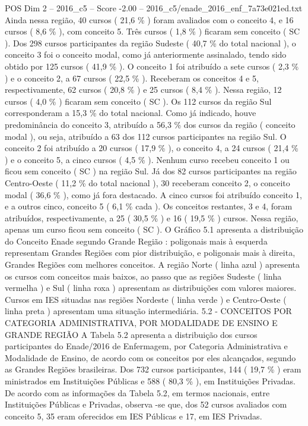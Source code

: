 \begin{textsample}{POS Dim 2 – 2016\_c5 – Score -2.00 – 2016\_c5/enade\_2016\_enf\_7a73e021ed.txt}
Ainda nessa região, 40 cursos ( 21,6 \% ) foram avaliados com o conceito 4, e 16 cursos ( 8,6 \% ), com conceito 5.
Três cursos ( 1,8 \% ) ficaram sem conceito ( SC ).
Dos 298 cursos participantes da região Sudeste ( 40,7 \% do total nacional ), o conceito 3 foi o conceito modal, como já anteriormente assinalado, tendo sido obtido por 125 cursos ( 41,9 \% ).
O conceito 1 foi atribuído a sete cursos ( 2,3 \% ) e o conceito 2, a 67 cursos ( 22,5 \% ).
Receberam os conceitos 4 e 5, respectivamente, 62 cursos ( 20,8 \% ) e 25 cursos ( 8,4 \% ).
Nessa região, 12 cursos ( 4,0 \% ) ficaram sem conceito ( SC ).
Os 112 cursos da região Sul corresponderam a 15,3 \% do total nacional.
Como já indicado, houve predominância do conceito 3, atribuído a 56,3 \% dos cursos da região ( conceito modal ), ou seja, atribuído a 63 dos 112 cursos participantes na região Sul.
O conceito 2 foi atribuído a 20 cursos ( 17,9 \% ), o conceito 4, a 24 cursos ( 21,4 \% ) e o conceito 5, a cinco cursos ( 4,5 \% ).
Nenhum curso recebeu conceito 1 ou ficou sem conceito ( SC ) na região Sul.
Já dos 82 cursos participantes na região Centro-Oeste ( 11,2 \% do total nacional ), 30 receberam conceito 2, o conceito modal ( 36,6 \% ), como já fora destacado.
A cinco cursos foi atribuído conceito 1, e a outros cinco, conceito 5 ( 6,1 \% cada ).
Os conceitos restantes, 3 e 4, foram atribuídos, respectivamente, a 25 ( 30,5 \% ) e 16 ( 19,5 \% ) cursos.
Nessa região, apenas um curso ficou sem conceito ( SC ).
O Gráfico 5.1 apresenta a distribuição do Conceito Enade segundo Grande Região : poligonais mais à esquerda representam Grandes Regiões com pior distribuição, e poligonais mais à direita, Grandes Regiões com melhores conceitos.
A região Norte ( linha azul ) apresenta os cursos com conceitos mais baixos, ao passo que as regiões Sudeste ( linha vermelha ) e Sul ( linha roxa ) apresentam as distribuições com valores maiores.
Cursos em IES situadas nas regiões Nordeste ( linha verde ) e Centro-Oeste ( linha preta ) apresentam uma situação intermediária. 5.2 - CONCEITOS POR CATEGORIA ADMINISTRATIVA, POR MODALIDADE DE ENSINO E GRANDE REGIÃO A Tabela 5.2 apresenta a distribuição dos cursos participantes do Enade/2016 de Enfermagem, por Categoria Administrativa e Modalidade de Ensino, de acordo com os conceitos por eles alcançados, segundo as Grandes Regiões brasileiras.
Dos 732 cursos participantes, 144 ( 19,7 \% ) eram ministrados em Instituições Públicas e 588 ( 80,3 \% ), em Instituições Privadas.
De acordo com as informações da Tabela 5.2, em termos nacionais, entre Instituições Públicas e Privadas, observa -se que, dos 52 cursos avaliados com conceito 5, 35 eram oferecidos em IES Públicas e 17, em IES Privadas.

\end{textsample}
